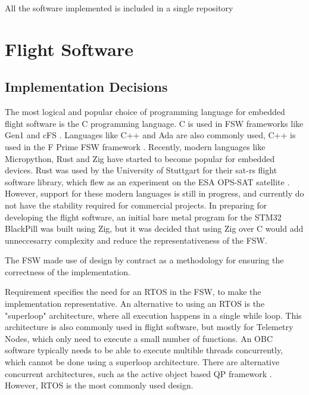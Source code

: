 \documentclass[../report.tex]{subfiles}
\begin{document}



All the software implemented is included in a single repository

\section{Flight Software}

\subsection{Implementation Decisions}

The most logical and popular choice of programming language for embedded flight
software is the C programming language. C is used in FSW frameworks like Gen1
and cFS \citep{Bal_FSDK, Nasa_cFS}. Languages like C++ and Ada are also
commonly used, C++ is used in the F Prime FSW framework \citep{Nasa_fprime}.
Recently, modern languages like Micropython, Rust and Zig have started to
become popular for embedded devices. Rust was used by the University of
Stuttgart for their sat-rs flight software library, which flew as an experiment
on the ESA OPS-SAT satellite \citep{satrs, opsat}. However, support for these
modern languages is still in progress, and currently do not have the stability
required for commercial projects. In preparing for developing the flight
software, an initial bare metal program for the STM32 BlackPill was built using
Zig, but it was decided that using Zig over C would add unneccesarry complexity
and reduce the representativeness of the FSW.

The FSW made use of design by contract as a methodology for ensuring the
correctness of the implementation. %

Requirement  specifies the need for an RTOS in the FSW, to make
the implementation representative. An alternative to using an RTOS is the
"superloop" architecture, where all execution happens in a single while loop.
This architecture is also commonly used in flight software, but mostly for
Telemetry Nodes, which only need to execute a small number of functions. An OBC
software typically needs to be able to execute multible threads concurrently,
which cannot be done using a superloop architecture. There are alternative
concurrent architectures, such as the active object based QP framework
\citep{QP}. However, RTOS is the most commonly used design.
\end{document}
